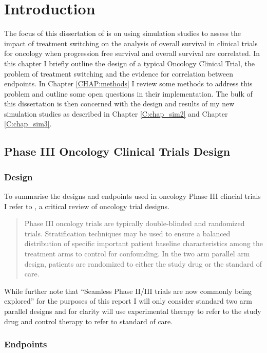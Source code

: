 \chapter{Introduction}
\label{CHAP:intro}

The focus of this dissertation of is on using simulation studies to assess the impact of treatment switching on the analysis of overall survival in clinical trials for oncology when progression free survival and overall survival are correlated. In this chapter I briefly outline the design of a typical Oncology Clinical Trial, the problem of treatment switching and the evidence for correlation between endpoints. In Chapter \ref{CHAP:methods} I review some methods to address this problem and outline some open questions in their implementation. The bulk of this dissertation is then concerned with the design and results of my new simulation studies as described in Chapter \ref{C:chap_sim2} and Chapter \ref{C:chap_sim3}. 

\section{Phase III Oncology Clinical Trials Design}

\subsection{Design}
To summarise the designs and endpoints used in oncology Phase III clincial trials I refer to \cite{DesignOnco2013}, a critical review of oncology trial designs.
\begin{quote}
Phase III oncology trials are typically double-blinded and randomized trials. Stratification techniques may be used to ensure a balanced distribution of specific important patient baseline characteristics among the treatment arms to control for confounding. In the two arm parallel arm design, patients
are randomized to either the study drug or the standard of care.
\end{quote}
While \cite{DesignOnco2013} further note that ``Seamless Phase II/III trials are now commonly being explored'' for the purposes of this report I will only consider standard two arm parallel designs and for clarity will use experimental therapy to refer to the study drug and control therapy to refer to standard of care. 

\subsection{Endpoints}

